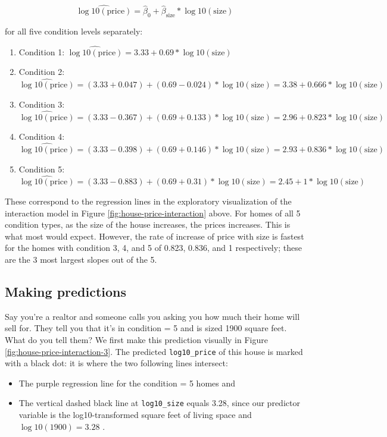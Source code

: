 \documentclass[12pt, krantz2,]{krantz}
\providecommand{\tightlist}{%
  \setlength{\itemsep}{0pt}\setlength{\parskip}{0pt}}
\begin{document}
\[\widehat{\log10(\text{price})} = \hat{\beta}_0 + \hat{\beta}_{\text{size}} * \log10(\text{size})\]

for all five condition levels separately:

\begin{enumerate}
\def\labelenumi{\arabic{enumi}.}
\tightlist
\item
  Condition 1: \(\widehat{\log10(\text{price})} = 3.33 + 0.69 * \log10(\text{size})\)
\item
  Condition 2: \(\widehat{\log10(\text{price})} = (3.33 + 0.047) + (0.69 - 0.024) * \log10(\text{size}) = 3.38 + 0.666 * \log10(\text{size})\)
\item
  Condition 3: \(\widehat{\log10(\text{price})} = (3.33 - 0.367) + (0.69 + 0.133) * \log10(\text{size}) = 2.96 + 0.823 * \log10(\text{size})\)
\item
  Condition 4: \(\widehat{\log10(\text{price})} = (3.33 - 0.398) + (0.69 + 0.146) * \log10(\text{size}) = 2.93 + 0.836 * \log10(\text{size})\)
\item
  Condition 5: \(\widehat{\log10(\text{price})} = (3.33 - 0.883) + (0.69 + 0.31) * \log10(\text{size}) = 2.45 + 1 * \log10(\text{size})\)
\end{enumerate}

These correspond to the regression lines in the exploratory visualization of the interaction model in Figure \ref{fig:house-price-interaction} above. For homes of all 5 condition types, as the size of the house increases, the prices increases. This is what most would expect. However, the rate of increase of price with size is fastest for the homes with condition 3, 4, and 5 of 0.823, 0.836, and 1 respectively; these are the 3 most largest slopes out of the 5.

\hypertarget{house-prices-making-predictions}{%
\subsection{Making predictions}\label{house-prices-making-predictions}}

Say you're a realtor and someone calls you asking you how much their home will sell for. They tell you that it's in condition = 5 and is sized 1900 square feet. What do you tell them? We first make this prediction visually in Figure \ref{fig:house-price-interaction-3}. The predicted \texttt{log10\_price} of this house is marked with a black dot: it is where the two following lines intersect:

\begin{itemize}
\tightlist
\item
  The purple regression line for the condition = 5 homes and
\item
  The vertical dashed black line at \texttt{log10\_size} equals 3.28, since our predictor variable is the log10-transformed square feet of living space and \(\log10(1900) = 3.28\) .
\end{itemize}
\end{document}
